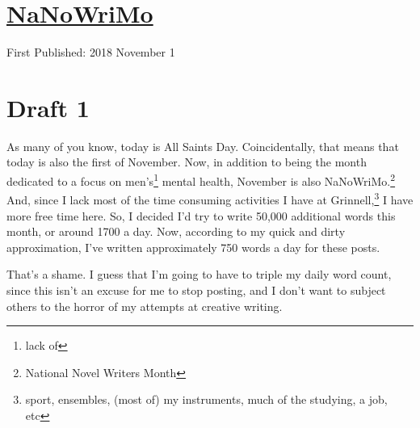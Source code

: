 \documentclass[12pt]{article}[titlepage]
\newcommand{\1}{\={a}}
\newcommand{\2}{\={e}}
\newcommand{\3}{\={\i}}
\newcommand{\4}{\=o}
\newcommand{\5}{\=u}
\newcommand{\6}{\={A}}
\renewcommand{\,}{\textsuperscript{,}}
\begin{document}
\doublespacing
\section{\href{nanowrimo.html}{NaNoWriMo}}
First Published: 2018 November 1
\section{Draft 1}
As many of you know, today is All Saints Day.
Coincidentally, that means that today is also the first of November.
Now, in addition to being the month dedicated to a focus on men's\footnote{lack of} mental health, November is also NaNoWriMo.\footnote{National Novel Writers Month}
And, since I lack most of the time consuming activities I have at Grinnell,\footnote{sport, ensembles, (most of) my instruments, much of the studying, a job, etc} I have more free time here.
So, I  decided I'd try to write 50,000 additional words this month, or around 1700 a day.
Now, according to my quick and dirty approximation, I've written approximately 750 words a day for these posts.

That's a shame.
I guess that I'm going to have to triple my daily word count, since this isn't an excuse for me to stop posting, and I don't want to subject others to the horror of my attempts at creative writing.
\end{document}
